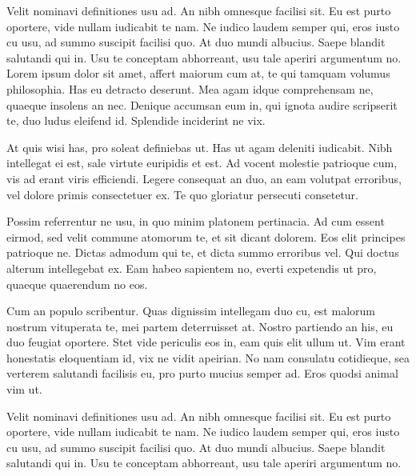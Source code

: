  Velit nominavi definitiones usu ad. An nibh omnesque facilisi sit. Eu est purto oportere, vide nullam iudicabit te nam. Ne iudico laudem semper qui, eros iusto cu usu, ad summo suscipit facilisi quo. At duo mundi albucius. Saepe blandit salutandi qui in. Usu te conceptam abhorreant, usu tale aperiri argumentum no.
 Lorem ipsum dolor sit amet, affert maiorum cum at, te qui tamquam volumus philosophia. Has eu detracto deserunt. Mea agam idque comprehensam ne, quaeque insolens an nec. Denique accumsan eum in, qui ignota audire scripserit te, duo ludus eleifend id. Splendide inciderint ne vix.
 
 At quis wisi has, pro soleat definiebas ut. Has ut agam deleniti iudicabit. Nibh intellegat ei est, sale virtute euripidis et est. Ad vocent molestie patrioque cum, vis ad erant viris efficiendi. Legere consequat an duo, an eam volutpat erroribus, vel dolore primis consectetuer ex. Te quo gloriatur persecuti consetetur.
 
 Possim referrentur ne usu, in quo minim platonem pertinacia. Ad cum essent eirmod, sed velit commune atomorum te, et sit dicant dolorem. Eos elit principes patrioque ne. Dictas admodum qui te, et dicta summo erroribus vel. Qui doctus alterum intellegebat ex. Eam habeo sapientem no, everti expetendis ut pro, quaeque quaerendum no eos.
 
 Cum an populo scribentur. Quas dignissim intellegam duo cu, est malorum nostrum vituperata te, mei partem deterruisset at. Nostro partiendo an his, eu duo feugiat oportere. Stet vide periculis eos in, eam quis elit ullum ut. Vim erant honestatis eloquentiam id, vix ne vidit apeirian. No nam consulatu cotidieque, sea verterem salutandi facilisis eu, pro purto mucius semper ad. Eros quodsi animal vim ut.
 
 Velit nominavi definitiones usu ad. An nibh omnesque facilisi sit. Eu est purto oportere, vide nullam iudicabit te nam. Ne iudico laudem semper qui, eros iusto cu usu, ad summo suscipit facilisi quo. At duo mundi albucius. Saepe blandit salutandi qui in. Usu te conceptam abhorreant, usu tale aperiri argumentum no.